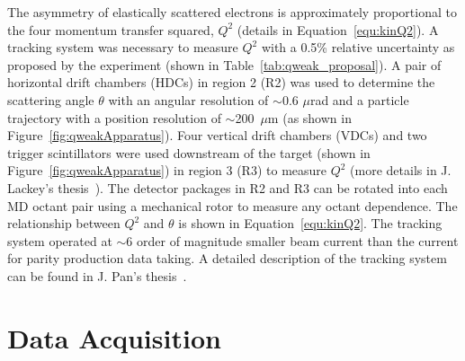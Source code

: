 The asymmetry of elastically scattered electrons is approximately proportional to the four momentum transfer squared, $Q^{2}$ (details in Equation~\ref{equ:kinQ2}). A tracking system was necessary to measure $Q^{2}$ with a 0.5\% relative uncertainty as proposed by the experiment (shown in Table~\ref{tab:qweak_proposal}). A pair of horizontal drift chambers (HDCs) in region 2 (R2) was used to determine the scattering angle $\theta$ with an angular resolution of $\sim$0.6 $\mu$rad and a particle trajectory with a position resolution of $\sim$200~$\mu$m (as shown in Figure~\ref{fig:qweakApparatus}). Four vertical drift chambers (VDCs) and two trigger scintillators were used downstream of the target (shown in Figure~\ref{fig:qweakApparatus}) in region 3 (R3) to measure $Q^{2}$ (more details in J. Lackey's thesis~\cite{lackey_qweak}). The detector packages in R2 and R3 can be rotated into each MD octant pair using a mechanical rotor to measure any octant dependence. The relationship between $Q^{2}$ and $\theta$ is shown in Equation~\ref{equ:kinQ2}. The tracking system operated at $\sim$6 order of magnitude smaller beam current than the current for parity production data taking. A detailed description of the tracking system can be found in J. Pan's thesis~\cite{jie_qweak_thesis}.


\section{Data Acquisition}%
\label{Data Acquisition}

